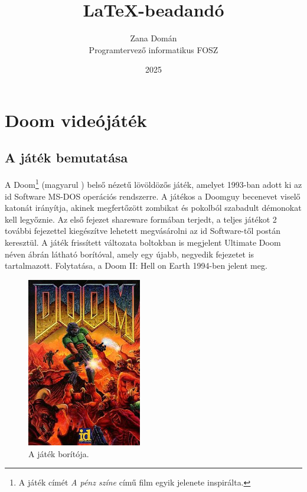 \documentclass{thesis-ekf}
\theoremstyle{definition}
\begin{document}
\title{\LaTeX-beadandó}
\author{Zana Domán\\Programtervező informatikus FOSZ}
\date{2025}
\maketitle

\tableofcontents

\chapter{Doom videójáték}

\section{A játék bemutatása}

A Doom\footnote{A játék címét \emph{A pénz színe} című film egyik jelenete
inspirálta.} (magyarul ) belső nézetű lövöldözős játék, amelyet
1993-ban adott ki az id Software MS-DOS operációs rendszerre. A játékos a
Doomguy becenevet viselő katonát irányítja, akinek megfertőzött zombikat és
pokolból szabadult démonokat kell legyőznie. Az első fejezet shareware formában
terjedt, a teljes játékot 2 további fejezettel kiegészítve lehetett megvásárolni
az id Software-től postán keresztül. A játék frissített változata boltokban is
megjelent Ultimate Doom néven  ábrán látható borítóval, amely
egy újabb, negyedik fejezetet is tartalmazott. Folytatása, a Doom II: Hell on
Earth 1994-ben jelent meg. \cite[Bevezető]{doomgame}

\begin{figure}[h]
    \centering
    \includegraphics[width=5cm]{doom.jpg}
    \caption{A játék borítója.}
    \label{fig:borito}
\end{figure}
\end{document}
